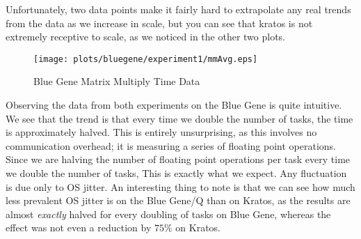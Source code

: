 \documentclass[twocolumn]{article}
\begin{document}
Unfortunately, two data points make it fairly hard to extrapolate any real trends 
from the data as we increase in scale, but you can see that kratos is not 
extremely receptive to scale, as we noticed in the other two plots. \\

\begin{figure}
  \centering
  \texttt{[image: plots/bluegene/experiment1/mmAvg.eps]}
  \caption{Blue Gene Matrix Multiply Time Data}
\end{figure}

Observing the data from both experiments on the Blue Gene is quite intuitive. We 
see that the trend is that every time we double the number of tasks, the time is
approximately halved. This is entirely unsurprising, as this involves no 
communication overhead; it is measuring a series of floating point operations. Since
we are halving the number of floating point operations per task every time we 
double the number of tasks, This is exactly what we expect. Any fluctuation is due
only to OS jitter. An interesting thing to note is that we can see how much less 
prevalent OS jitter is on the Blue Gene/Q than on Kratos, as the results are almost
\emph{exactly} halved for every doubling of tasks on Blue Gene, whereas the effect
was not even a reduction by $75\%$ on Kratos. 
 
\end{document}
